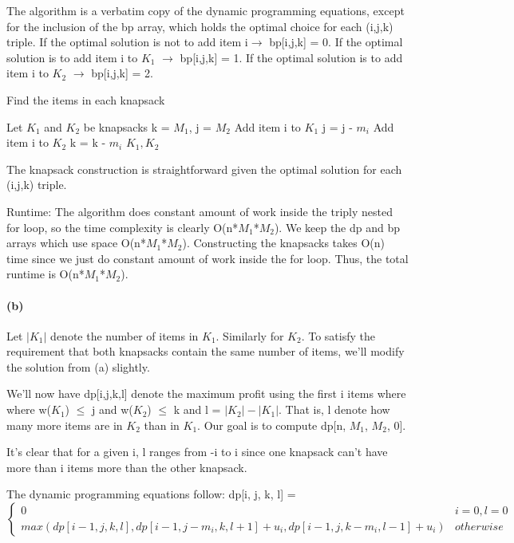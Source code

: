 \documentclass[11pt,a4paper]{article}
\begin{document}
The algorithm is a verbatim copy of the dynamic programming equations, except for the inclusion of the bp array, which holds the optimal choice for each (i,j,k) triple. If the optimal solution is not to add item i$\rightarrow$ bp[i,j,k] = 0. If the optimal solution is to add item i to $K_{1}$ $\rightarrow$ bp[i,j,k] = 1. If the optimal solution is to add item i to $K_{2}$ $\rightarrow$ bp[i,j,k] = 2. 
\begin{algorithm}
	\caption{Find the items in each knapsack}
	\begin{algorithmic}[1]
	\State Let $K_{1}$ and $K_{2}$ be knapsacks
	\State k = $M_{1}$, j = $M_{2}$
			\State Add item i to $K_{1}$
			\State j = j - $m_{i}$
			\State Add item i to $K_{2}$
			\State k = k - $m_{i}$
		\EndIf
	\EndFor
	\State \Return $K_{1}, K_{2}$
	\EndFunction
	\end{algorithmic}
	\end{algorithm}
	
The knapsack construction is straightforward given the optimal solution for each (i,j,k) triple.

Runtime: The algorithm does constant amount of work inside the triply nested for loop, so the time complexity is clearly O(n*$M_{1}$*$M_{2}$). We keep the dp and bp arrays which use space O(n*$M_{1}$*$M_{2}$). Constructing the knapsacks takes O(n) time since we just do constant amount of work inside the for loop. Thus, the total runtime is O(n*$M_{1}$*$M_{2}$). 

\paragraph*{(b)}
Let $|K_{1}|$ denote the number of items in $K_{1}$. Similarly for $K_{2}$. To satisfy the requirement that both knapsacks contain the same number of items, we'll modify the solution from (a) slightly. 

We'll now have dp[i,j,k,l] denote the maximum profit using the first i items where where w($K_{1}$) $\leq$ j and w($K_{2}$) $\leq$ k and l = $|K_{2}| - |K_{1}|$. That is, l denote how many more items are in $K_{2}$ than in $K_{1}$. Our goal is to compute dp[n, $M_{1}$, $M_{2}$, 0].

It's clear that for a given i, l ranges from -i to i since one knapsack can't have more than i items more than the other knapsack.

The dynamic programming equations follow:
dp[i, j, k, l] = 
\[ \begin{cases} 
      0 & i = 0, l = 0 \\
      max(dp[i-1,j,k,l], dp[i-1, j - m_{i}, k, l+1] + u_{i}, dp[i-1, j, k - m_{i}, l-1] + u_{i}) & otherwise
   \end{cases}
\]
\end{document}
